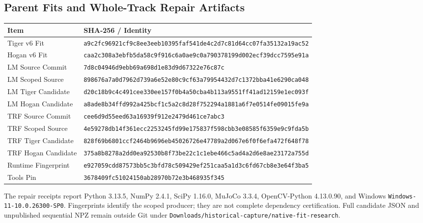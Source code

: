 \documentclass[11pt,letterpaper]{article}
\newcommand{\code}[1]{\nolinkurl{#1}}
\newcommand{\hash}[1]{{\footnotesize\nolinkurl{#1}}}
\begin{document}
\subsection{Parent Fits and Whole-Track Repair Artifacts}
\begin{longtable}{@{}p{1.45in}p{4.85in}@{}}
\toprule Item & SHA-256 / Identity\\\midrule\endhead
Tiger v6 Fit & \hash{a9c2fc96921cf9c8ee3eeb10395faf541de4c2d7c81d64cc07fa35132a19ac52}\\
Hogan v6 Fit & \hash{caa2c308a3ebfb5da58c9f916c6a0ae9c0a790378199d002ecf39dcc7595e91a}\\
LM Source Commit & \hash{7d8c04946d9ebb69a698d1e83d9d67322e76c87c}\\
LM Scoped Source & \hash{898676a7a0d7962d739a6e52e80c9cf63a79954432d7c1372bba41e6290ca048}\\
LM Tiger Candidate & \hash{d20c18b9c4c491cee330ee157f0b4a50cba4b113a9551ff41ad12159e1ec093f}\\
LM Hogan Candidate & \hash{a8ade8b34ffd992a425bcf1c5a2c8d28f752294a1881a6f7e0514fe09015fe9a}\\
TRF Source Commit & \hash{cee6d9d55eed63a16939f912e2479d461ce7abc3}\\
TRF Scoped Source & \hash{4e59278db14f361ecc2253245fd99e175837f598cbb3e08585f6359e9c9fda5b}\\
TRF Tiger Candidate & \hash{828f69b6801ccf2464b9696eb45026726e47789a2d067e6f0f6efa472f648f78}\\
TRF Hogan Candidate & \hash{375a8b8278a2dd0ea92530b8f73be22c1c1ebe466c5ad4a2d6e8ae23172a755d}\\
Runtime Fingerprint & \hash{e927059cdd87573bb5c3bfd78c509429ef251caa5a1d3c6fd67cb8e3e64f3ba5}\\
Tools Pin & \hash{3678409fc51024150ab28970b72e3b468935f345}\\
\bottomrule
\end{longtable}
The repair receipts report Python 3.13.5, NumPy 2.4.1, SciPy 1.16.0,
MuJoCo 3.3.4, OpenCV-Python 4.13.0.90, and Windows
\code{Windows-11-10.0.26300-SP0}. Fingerprints identify the scoped producer;
they are not complete dependency certification. Full candidate JSON and
unpublished sequential NPZ remain outside Git under
\code{Downloads/historical-capture/native-fit-research}.
\end{document}
